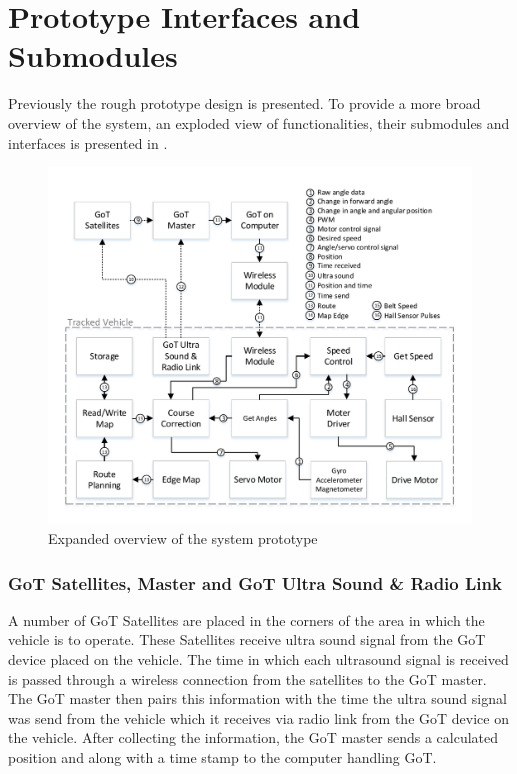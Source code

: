 \section{Prototype Interfaces and Submodules}
Previously the rough prototype design is presented. To provide a more broad overview of the system, an exploded view of functionalities, their submodules and interfaces is presented in .

\begin{figure}[H]
	\centering
	\includegraphics[scale=.9]{figures/systemOverview2}
	\caption{Expanded overview of the system prototype}
	\label{fig:systemOverview2}
\end{figure}


\subsubsection{GoT Satellites, Master and GoT Ultra Sound \& Radio Link}
A number of GoT Satellites are placed in the corners of the area in which the vehicle is to operate. These Satellites receive ultra sound signal from the GoT device placed on the vehicle. The time in which each ultrasound signal is received is passed through a wireless connection from the satellites to the GoT master. The GoT master then pairs this information with the time the ultra sound signal was send from the vehicle which it receives via radio link from the GoT device on the vehicle. After collecting the information, the GoT master sends a calculated position and along with a time stamp to the computer handling GoT.


